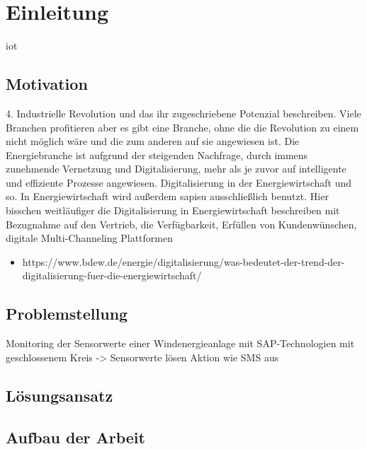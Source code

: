 \section{Einleitung}

\ac{iot}



\subsection{Motivation}
4. Industrielle Revolution und das ihr zugeschriebene Potenzial beschreiben. Viele Branchen profitieren aber es gibt eine Branche,
ohne die die Revolution zu einem nicht möglich wäre und die zum anderen auf sie angewiesen ist.
Die Energiebranche ist aufgrund der steigenden Nachfrage, durch immens zunehmende Vernetzung und Digitalisierung, mehr als je zuvor auf intelligente und effiziente Prozesse angewiesen.
Digitalisierung in der Energiewirtschaft und so. In Energiewirtschaft wird außerdem \ac{sapisu} ausschließlich benutzt.
Hier bisschen weitläufiger die Digitalisierung in Energiewirtschaft beschreiben mit Bezugnahme auf den Vertrieb,
die Verfügbarkeit, Erfüllen von Kundenwünschen, digitale Multi-Channeling Plattformen
 \begin{itemize}
   \item https://www.bdew.de/energie/digitalisierung/was-bedeutet-der-trend-der-digitalisierung-fuer-die-energiewirtschaft/

 \end{itemize}
\subsection{Problemstellung}
Monitoring der Sensorwerte einer Windenergieanlage mit SAP-Technologien mit geschlossenem Kreis -> Sensorwerte lösen Aktion wie SMS aus

\subsection{Lösungsansatz}
\textcolor{red}{\blindtext}

\subsection{Aufbau der Arbeit}
\textcolor{red}{\blindtext}
